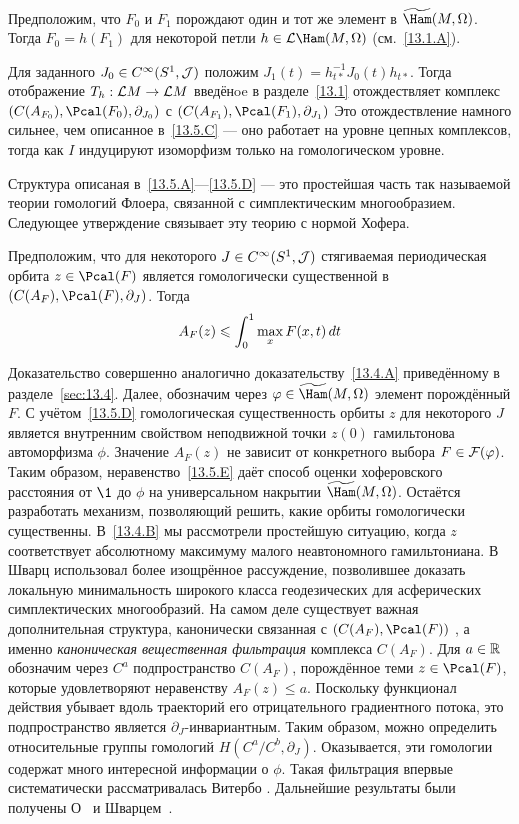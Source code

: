 \begin{ex}{}\label{13.5.D}
Предположим, что $F_{0}$ и $F_{1}$ порождают один и тот же элемент в
$\widetilde\Ham(M,\Omega)$. 
Тогда $F_{0} = h(F_{1})$ для некоторой петли $h\z\in\L\Ham(M,\Omega)$
(см.~\ref{13.1.A}).
\end{ex}

Для заданного $J_{0}\in C^{\infty}(S^{1},\mathcal{J})$ положим
$J_{1}(t)=h_{t*}^{-1}J_{0}(t)h_{t*}$. Тогда отображение $T_{h}:\mathcal{L}
M\to\mathcal{L} M$ введёнoe в разделе~\ref{13.1} отождествляет
комплекс $(C(A_{F_{0}}),\Pcal(F_{0}),\partial_{J_{0}})$ с
$(C(A_{F_{1}}),\Pcal(F_{1}),\partial_{J_{1}})$ 
Это отождествление намного сильнее, чем описанное в~\ref{13.5.C}
— оно работает на уровне цепных комплексов, тогда как $I$ индуцируют
изоморфизм только на гомологическом уровне. 

\medskip
Структура описаная в~\ref{13.5.A}—\ref{13.5.D} — это простейшая
часть так называемой теории гомологий 
Флоера, связанной с симплектическим многообразием. 
Следующее утверждение связывает эту теорию с нормой Хофера.

\begin{ex}{}\label{13.5.E}
Предположим, что для некоторого $J\in C^{\infty}(S^{1},\mathcal{J})$
стягиваемая периодическая орбита $z\in\Pcal(F)$ является гомологически
существенной в $(C(A_{F}),\Pcal(F),\partial_{J})$. Тогда
\[
A_{F}(z)\leqslant\int_{0}^{1}\max_{x}F(x,t)\,d t
\]
\end{ex}

Доказательство совершенно аналогично доказательству~\ref{13.4.A}
приведённому в разделе~\ref{sec:13.4}.
Далее, обозначим через $\phi\in\widetilde\Ham(M,\Omega)$ элемент порождённый $F$.
С учётом~\ref{13.5.D} гомологическая
существенность орбиты $z$ для некоторого $J$ является внутренним свойством
неподвижной точки $z(0)$ гамильтонова автоморфизма $\phi$.
Значение $A_{F}(z)$ не зависит от конкретного выбора $F\in\mathcal{F}(\varphi)$.
Таким образом, неравенство~\ref{13.5.E} даёт способ оценки хоферовского расстояния от $\1$ до $\phi$ на универсальном накрытии $\widetilde\Ham(M,\Omega)$.
Остаётся разработать механизм, позволяющий решить, какие орбиты
гомологически существенны. 
В~\ref{13.4.B} мы рассмотрели простейшую ситуацию, когда $z$ соответствует абсолютному максимуму малого неавтономного гамильтониана. 
В~\cite{Sch3} Шварц использовал более изощрённое
рассуждение, позволившее доказать локальную минимальность широкого
класса геодезических для асферических симплектических многообразий.  
На самом деле существует важная дополнительная структура,
канонически связанная с $(C(A_{F}),\Pcal(F))$
, а именно
\textit{каноническая вещественная фильтрация} комплекса $C(A_{F})$.
Для $a\in\mathbb{R}$ обозначим через $C^{a}$ подпространство $C(A_{F})$,
порождённое теми $z\in\Pcal(F)$, которые удовлетворяют неравенству
$A_{F}(z)\le a$.
Поскольку функционал действия убывает вдоль траекторий его
отрицательного градиентного потока, это подпространство является
$\partial_{J}$-инвариантным. 
Таким образом, можно определить относительные группы гомологий
$H(C^{a}/C^{b},\partial_{J})$.
Оказывается, эти гомологии содержат много интересной информации о $\phi$.
Такая фильтрация впервые систематически рассматривалась Витербо \cite{V1}.
Дальнейшие результаты были получены О~\cite{O4} и Шварцем~\cite{Sch3}.

